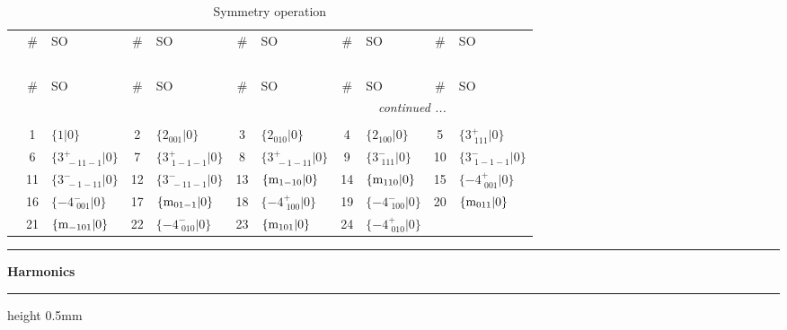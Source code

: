 \documentclass[fleqn,10pt,landscape]{jsarticle}
\begin{document}
\renewcommand{\arraystretch}{1.6}
\begin{longtable}[l]{c|cl|cl|cl|cl|cl}
\captionsetup{justification=raggedright, singlelinecheck=off}
\caption{Symmetry operation}
 \\
 \hline \hline
 & \# & SO & \# & SO & \# & SO & \# & SO & \# & SO \\ \hline \endfirsthead

\multicolumn{10}{l}{\tablename\ \thetable{}} \\
 \hline \hline
 & \# & SO & \# & SO & \# & SO & \# & SO & \# & SO \\ \hline \endhead

 \hline \hline
\multicolumn{10}{r}{\footnotesize\it continued ...} \\ \endfoot

 \hline \hline
\multicolumn{10}{r}{} \\ \endlastfoot

 & 1 & $\{1|0\}$ & 2 & $\{2{}_{001}|0\}$ & 3 & $\{2{}_{010}|0\}$ & 4 & $\{2{}_{100}|0\}$ & 5 & $\{3^{+}_{\,\,111}|0\}$ \\
& 6 & $\{3^{+}_{\,\,-11-1}|0\}$ & 7 & $\{3^{+}_{\,\,1-1-1}|0\}$ & 8 & $\{3^{+}_{\,\,-1-11}|0\}$ & 9 & $\{3^{-}_{\,\,111}|0\}$ & 10 & $\{3^{-}_{\,\,1-1-1}|0\}$ \\
& 11 & $\{3^{-}_{\,\,-1-11}|0\}$ & 12 & $\{3^{-}_{\,\,-11-1}|0\}$ & 13 & $\{{\rm m}_{1-10}|0\}$ & 14 & $\{{\rm m}_{110}|0\}$ & 15 & $\{-4^{+}_{\,\,001}|0\}$ \\
& 16 & $\{-4^{-}_{\,\,001}|0\}$ & 17 & $\{{\rm m}_{01-1}|0\}$ & 18 & $\{-4^{+}_{\,\,100}|0\}$ & 19 & $\{-4^{-}_{\,\,100}|0\}$ & 20 & $\{{\rm m}_{011}|0\}$ \\
& 21 & $\{{\rm m}_{-101}|0\}$ & 22 & $\{-4^{-}_{\,\,010}|0\}$ & 23 & $\{{\rm m}_{101}|0\}$ & 24 & $\{-4^{+}_{\,\,010}|0\}$ &  &  \\
\end{longtable}
\vspace{5mm}
\noindent \rule[0.5mm]{5mm}{0.5mm}\hspace{3mm}\textbf{Harmonics}\hspace{3mm}\leaders\hrule height 0.5mm\hfill\kern0pt
\vspace{3mm}
\end{document}
